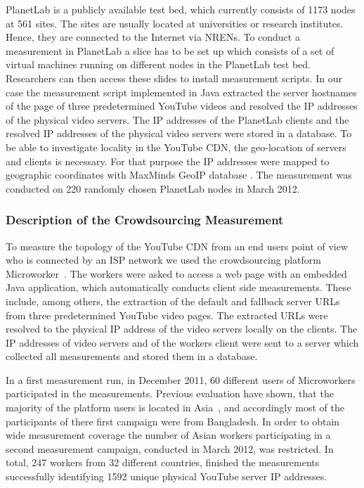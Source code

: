 PlanetLab is a publicly available test bed, which currently consists of 1173 nodes at 561 sites.
The sites are usually located at universities or research institutes.
Hence, they are connected to the Internet via NRENs.
To conduct a measurement in PlanetLab a slice has to be set up which consists of a set of virtual machines running on different nodes in the PlanetLab test bed.
Researchers can then access these slides to install measurement scripts.
In our case the measurement script implemented in Java extracted the server hostnames of the page of three predetermined YouTube videos and resolved the IP addresses of the physical video servers.
The IP addresses of the PlanetLab clients and the resolved IP addresses of the physical video servers were stored in a database.
To be able to investigate locality in the YouTube CDN, the geo-location of servers and clients is necessary.
For that purpose the IP addresses were mapped to geographic coordinates with MaxMinds GeoIP database \cite{geolite}.
The measurement was conducted on 220 randomly chosen PlanetLab nodes in March 2012.

\subsubsection{Description of the Crowdsourcing Measurement}
To measure the topology of the YouTube CDN from an end users point of view who is connected by an ISP network we used the crowdsourcing platform Microworker~\cite{microworkers}.
The workers were asked to access a web page with an embedded Java application, which automatically conducts client side measurements.
These include, among others, the extraction of the default and fallback server URLs from three predetermined YouTube video pages.
The extracted URLs were resolved to the physical IP address of the video servers locally on the clients.
The IP addresses of video servers and of the workers client were sent to a server which collected all measurements and stored them in a database.

In a first measurement run, in December 2011, 60 different users of Microworkers participated in the measurements.
Previous evaluation have shown, that the majority of the platform users is located in Asia~\cite{conf2011-410}, and accordingly most of the participants of there first campaign were from Bangladesh.
In order to obtain wide measurement coverage the number of Asian workers participating in a second measurement campaign, conducted in March 2012, was restricted.
In total, 247 workers from 32 different countries, finished the measurements successfully identifying 1592 unique physical YouTube server IP addresses.

